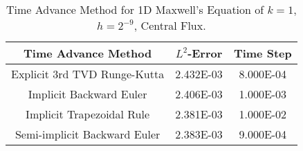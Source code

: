 \documentclass[a4paper]{article}
\begin{document}
\begin{table}
\caption{Time Advance Method for 1D Maxwell's Equation of $k=1$, $h=2^{-9}$, Central Flux.}\vspace{5pt}
\centering
\begin{tabular}{c|c|c}\toprule\hline
Time Advance Method & $L^2$-Error & Time Step \\ \hline
Explicit 3rd TVD Runge-Kutta  & 2.432E-03 & 8.000E-04\\ %
Implicit Backward Euler & 2.406E-03 & 1.000E-03\\ %
Implicit Trapezoidal Rule & 2.381E-03 & 1.000E-02\\ %
Semi-implicit Backward Euler & 2.383E-03 & 9.000E-04\\ \hline
\bottomrule
\end{tabular}
\end{table}


\end{document}
